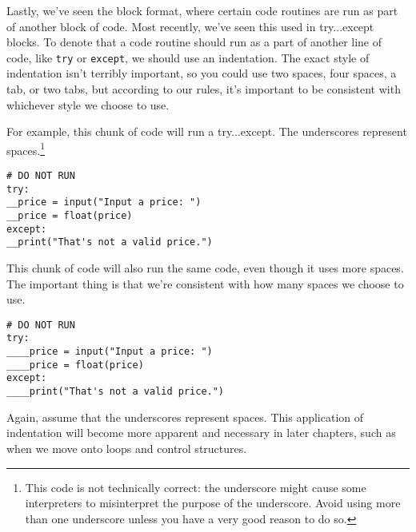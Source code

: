 Lastly, we've seen the block format, where certain code routines are run as part of another block of code. Most recently, we've seen this used in try...except blocks. To denote that a code routine should run as a part of another line of code, like \verb|try| or \verb|except|, we should use an indentation. The exact style of indentation isn't terribly important, so you could use two spaces, four spaces, a tab, or two tabs, but according to our  rules, it's important to be consistent with whichever style we choose to use.\par
For example, this chunk of code will run a try...except. The underscores represent spaces.\footnote{This code is not technically correct: the underscore might cause some interpreters to misinterpret the purpose of the underscore. Avoid using more than one underscore unless you have a very good reason to do so.}
\begin{lstlisting}[style=pippython]
# DO NOT RUN
try:
__price = input("Input a price: ")
__price = float(price)
except:
__print("That's not a valid price.")
\end{lstlisting}
This chunk of code will also run the same code, even though it uses more spaces. The important thing is that we're consistent with how many spaces we choose to use.
\begin{lstlisting}[style=pippython]
# DO NOT RUN
try:
____price = input("Input a price: ")
____price = float(price)
except:
____print("That's not a valid price.")
\end{lstlisting}
Again, assume that the underscores represent spaces. This application of indentation will become more apparent and necessary in later chapters, such as when we move onto loops and control structures.\par
